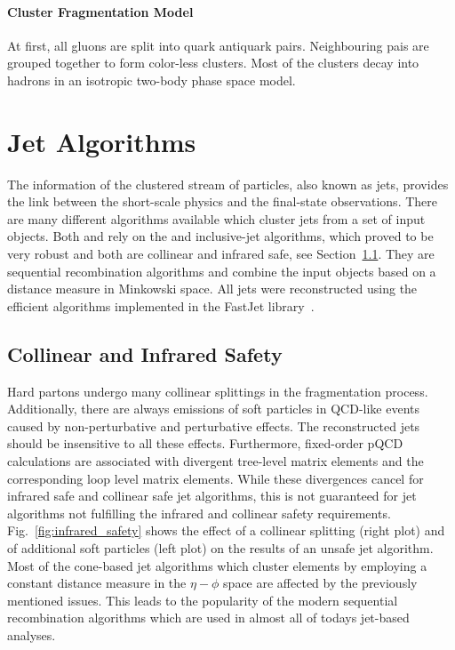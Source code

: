 \paragraph{Cluster Fragmentation Model}

At first, all gluons are split into quark antiquark pairs. Neighbouring pais are
grouped together to form color-less clusters. Most of the clusters decay into
hadrons in an isotropic two-body phase space model.

\section{Jet Algorithms}
\label{sec:jet_algorithms}

The information of the clustered stream of particles, also known as jets,
provides the link between the short-scale physics and the final-state
observations. There are many different algorithms available which cluster jets
from a set of input objects. Both \CMS and \ATLAS rely on the \antikt and
inclusive-\kt jet algorithms, which proved to be very robust and both are
collinear and infrared safe, see Section~\ref{sec:coll_safety}. They are
sequential recombination algorithms and combine the input objects based on a
distance measure in Minkowski space. All jets were reconstructed using the
efficient algorithms implemented in the FastJet library~\cite{Cacciari:2011ma}.

\subsection{Collinear and Infrared Safety}
\label{sec:coll_safety}

Hard partons undergo many collinear splittings in the fragmentation process.
Additionally, there are always emissions of soft particles in QCD-like events
caused by non-perturbative and perturbative effects. The reconstructed jets
should be insensitive to all these effects. Furthermore, fixed-order pQCD
calculations are associated with divergent tree-level matrix elements and the
corresponding loop level matrix elements. While these divergences cancel for
infrared safe and collinear safe jet algorithms, this is not guaranteed for jet
algorithms not fulfilling the infrared and collinear safety requirements.
Fig.~\ref{fig:infrared_safety} shows the effect of a collinear splitting (right
plot) and of additional soft particles (left plot) on the results of an unsafe
jet algorithm. Most of the cone-based jet algorithms which cluster elements
by employing a constant distance measure in the $\eta-\phi$ space are affected by the
previously mentioned issues. This leads to the popularity of the modern sequential
recombination algorithms which are used in almost all of todays jet-based
analyses.

